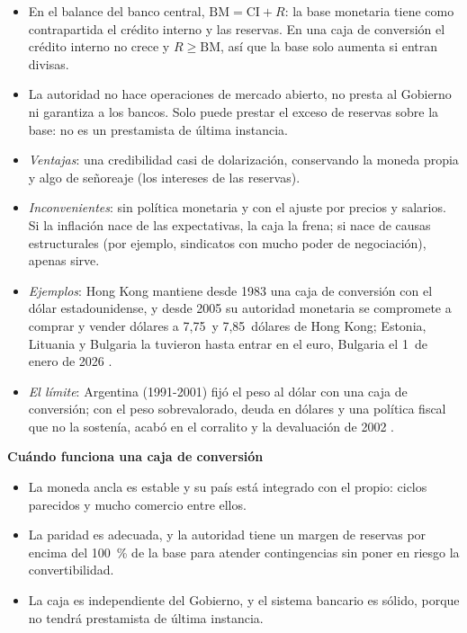 \documentclass[11pt]{article}
\begin{document}
\begin{itemize}
  \begin{itemize}
  \item En el balance del banco central, $\mathrm{BM}=\mathrm{CI}+R$: la base monetaria tiene como contrapartida el crédito interno y las reservas. En una caja de conversión el crédito interno no crece y $R\geq\mathrm{BM}$, así que la base solo aumenta si entran divisas.
  \item La autoridad no hace operaciones de mercado abierto, no presta al Gobierno ni garantiza a los bancos. Solo puede prestar el exceso de reservas sobre la base: no es un prestamista de última instancia.
  \item \emph{Ventajas}: una credibilidad casi de dolarización, conservando la moneda propia y algo de señoreaje (los intereses de las reservas).
  \item \emph{Inconvenientes}: sin política monetaria y con el ajuste por precios y salarios. Si la inflación nace de las expectativas, la caja la frena; si nace de causas estructurales (por ejemplo, sindicatos con mucho poder de negociación), apenas sirve.
  \item \emph{Ejemplos}: Hong Kong mantiene desde 1983 una caja de conversión con el dólar estadounidense, y desde 2005 su autoridad monetaria se compromete a comprar y vender dólares a 7,75~y 7,85~dólares de Hong Kong\nocite{HKMA2026LERS,HKMA2005Refinamientos}; Estonia, Lituania y Bulgaria la tuvieron hasta entrar en el euro, Bulgaria el 1~de enero de 2026 .
  \item \emph{El límite}: Argentina (1991-2001) fijó el peso al dólar con una caja de conversión; con el peso sobrevalorado, deuda en dólares y una política fiscal que no la sostenía, acabó en el corralito y la devaluación de 2002  .
  \end{itemize}
\end{itemize}

\begin{anotaciones}
\textbf{Cuándo funciona una caja de conversión}
\begin{itemize}
\item La moneda ancla es estable y su país está integrado con el propio: ciclos parecidos y mucho comercio entre ellos.
\item La paridad es adecuada, y la autoridad tiene un margen de reservas por encima del 100~\% de la base para atender contingencias sin poner en riesgo la convertibilidad.
\item La caja es independiente del Gobierno, y el sistema bancario es sólido, porque no tendrá prestamista de última instancia.
\end{itemize}
\end{anotaciones}
\end{document}
